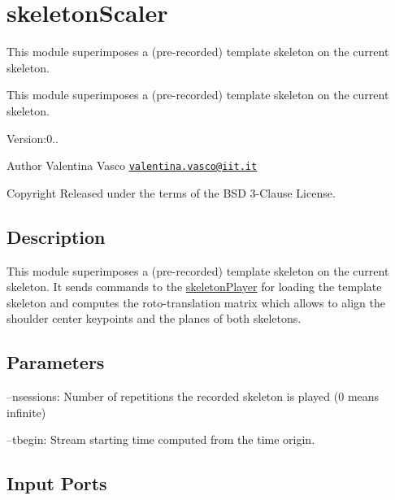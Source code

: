 \section{skeleton\+Scaler}
\label{group__skeletonScaler}


This module superimposes a (pre-\/recorded) template skeleton on the current skeleton.  


This module superimposes a (pre-\/recorded) template skeleton on the current skeleton. 

Version\+:0.. \begin{DoxyAuthor}{Author}
Valentina Vasco \href{mailto:valentina.vasco@iit.it}{\tt valentina.\+vasco@iit.\+it} ~\newline
 
\end{DoxyAuthor}
\begin{DoxyCopyright}{Copyright}
Released under the terms of the B\+SD 3-\/\+Clause License. 
\end{DoxyCopyright}
\hypertarget{group__skeletonViewer_intro_sec}{}\subsection{Description}\label{group__skeletonViewer_intro_sec}
This module superimposes a (pre-\/recorded) template skeleton on the current skeleton. It sends commands to the \hyperlink{group__skeletonPlayer}{skeleton\+Player} for loading the template skeleton and computes the roto-\/translation matrix which allows to align the shoulder center keypoints and the planes of both skeletons.\hypertarget{group__skeletonViewer_parameters_sec}{}\subsection{Parameters}\label{group__skeletonViewer_parameters_sec}

\begin{DoxyItemize}
\item --nsessions\+: Number of repetitions the recorded skeleton is played (0 means infinite)
\item --tbegin\+: Stream starting time computed from the time origin. 
\end{DoxyItemize}\hypertarget{group__skeletonViewer_inputports_sec}{}\subsection{Input Ports}\label{group__skeletonViewer_inputports_sec}

